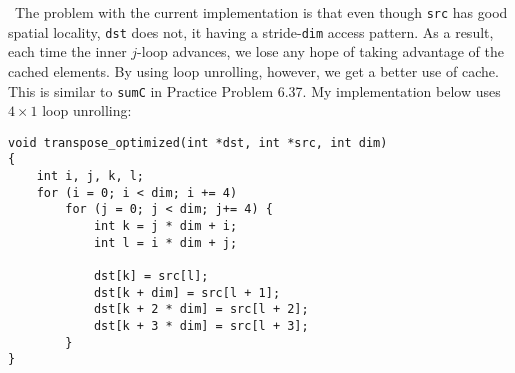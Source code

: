 \documentclass[12pt]{article}
\newenvironment{sol}[1][Solution]{\begin{trivlist}
		\item[\hskip \labelsep {\bfseries #1:}]}{\end{trivlist}}
\begin{document}
\begin{sol}
	\
	The problem with the current implementation is that even though \texttt{src} has good spatial locality,
	\texttt{dst} does not, it having a stride-\texttt{dim} access pattern. As a result, each time the inner
	$j$-loop advances, we lose any hope of taking advantage of the cached elements. By using loop unrolling,
	however, we get a better use of cache. This is similar to \texttt{sumC} in Practice Problem 6.37.
	My implementation below uses $4\times 1$ loop unrolling:
	\begin{lstlisting}
void transpose_optimized(int *dst, int *src, int dim)
{
	int i, j, k, l;
	for (i = 0; i < dim; i += 4)
		for (j = 0; j < dim; j+= 4) {
			int k = j * dim + i;
			int l = i * dim + j;
			
			dst[k] = src[l];
			dst[k + dim] = src[l + 1];
			dst[k + 2 * dim] = src[l + 2];
			dst[k + 3 * dim] = src[l + 3];
		}
}
	\end{lstlisting}
\end{sol}
\end{document}

